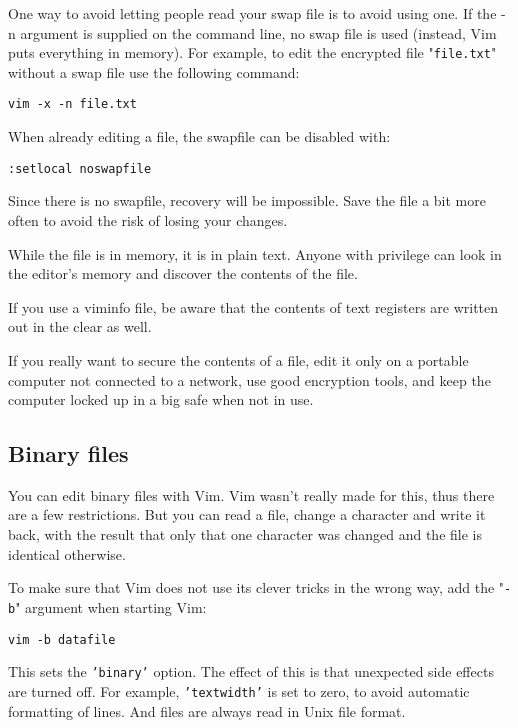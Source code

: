 One way to avoid letting people read your swap file is to avoid using one.
If the -n argument is supplied on the command line, no swap file is used (instead, Vim puts everything in memory).
For example, to edit the encrypted file "\texttt{file.txt}" without a swap file use the following command:

\begin{Verbatim}[samepage=true]
 vim -x -n file.txt
\end{Verbatim}

When already editing a file, the swapfile can be disabled with:

\begin{Verbatim}[samepage=true]
 :setlocal noswapfile
\end{Verbatim}

Since there is no swapfile, recovery will be impossible.
Save the file a bit more often to avoid the risk of losing your changes.

While the file is in memory, it is in plain text.
Anyone with privilege can look in the editor's memory and discover the contents of the file.

If you use a viminfo file, be aware that the contents of text registers are written out in the clear as well.

If you really want to secure the contents of a file, edit it only on a portable computer not connected to a network, use good encryption tools, and keep the computer locked up in a big safe when not in use.
\subsection{Binary files}
You can edit binary files with Vim.
Vim wasn't really made for this, thus there are a few restrictions.
But you can read a file, change a character and write it back, with the result that only that one character was changed and the file is identical otherwise.

To make sure that Vim does not use its clever tricks in the wrong way, add the "\texttt{-b}" argument when starting Vim:

\begin{Verbatim}[samepage=true]
 vim -b datafile
\end{Verbatim}

This sets the \texttt{'binary'} option.
The effect of this is that unexpected side effects are turned off.
For example, \texttt{'textwidth'} is set to zero, to avoid automatic formatting of lines.
And files are always read in Unix file format.

